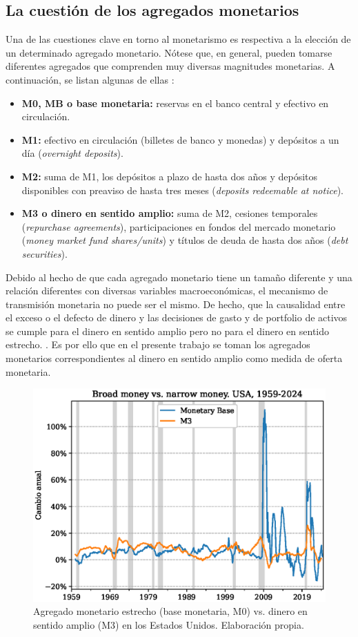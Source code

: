 \documentclass[titlepage, 12pt]{article}
\begin{document}
\subsection{La cuestión de los agregados monetarios}

Una de las cuestiones clave en torno al monetarismo es respectiva a la elección de un determinado agregado monetario. Nótese que, en general, pueden tomarse diferentes agregados que comprenden muy diversas magnitudes monetarias. A continuación, se listan algunas de ellas \autocite{oecd}:
\begin{itemize}
    \item \textbf{M0, MB o base monetaria:} reservas en el banco central y efectivo en circulación.
    \item \textbf{M1:} efectivo en circulación (billetes de banco y monedas) y depósitos a un día (\textit{overnight deposits}).
    \item  \textbf{M2:} suma de M1, los depósitos a plazo de hasta dos años y depósitos disponibles con preaviso de hasta tres meses (\textit{deposits redeemable at notice}).
    \item \textbf{M3 o dinero en sentido amplio:} suma de M2, cesiones temporales (\textit{repurchase agreements}), participaciones en fondos del mercado monetario (\textit{money market fund shares/units}) y títulos de deuda de hasta dos años (\textit{debt securities}).
\end{itemize}

Debido al hecho de que cada agregado monetario tiene un tamaño diferente y una relación diferentes con diversas variables macroeconómicas, el mecanismo de transmisión monetaria no puede ser el mismo. De hecho, que la causalidad entre el exceso o el defecto de dinero y las decisiones de gasto y de portfolio de activos se cumple para el dinero en sentido amplio pero no para el dinero en sentido estrecho.  \autocite[137]{congdon2024}. Es por ello que en el presente trabajo se toman los agregados monetarios correspondientes al dinero en sentido amplio como medida de oferta monetaria.

\newpage
\begin{figure}
    \centering
    \includegraphics[width=.8\textwidth]{plots/broad-vs-narrow-money.eps}
    \caption{Agregado monetario estrecho (base monetaria, M0) vs. dinero en sentido amplio (M3) en los Estados Unidos. Elaboración propia.}
    \label{fig:broad-vs-narrow-money}
\end{figure}
\end{document}

